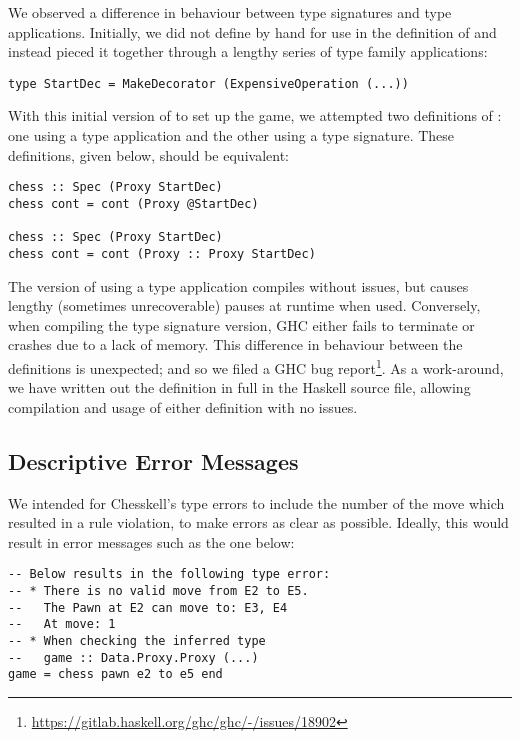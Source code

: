 We observed a difference in behaviour between type signatures and type applications. Initially, we did not define  by hand for use in the definition of  and instead pieced it together through a lengthy series of type family applications:

\begin{lstlisting}
type StartDec = MakeDecorator (ExpensiveOperation (...))
\end{lstlisting}

With this initial version of  to set up the game, we attempted two definitions of : one using a type application and the other using a type signature. These definitions, given below, should be equivalent:

\begin{lstlisting}
chess :: Spec (Proxy StartDec)
chess cont = cont (Proxy @StartDec)

chess :: Spec (Proxy StartDec)
chess cont = cont (Proxy :: Proxy StartDec)
\end{lstlisting}

The version of  using a type application compiles without issues, but causes lengthy (sometimes unrecoverable) pauses at runtime when used. Conversely, when compiling the type signature version, GHC either fails to terminate or crashes due to a lack of memory. This difference in behaviour between the definitions is unexpected; and so we filed a GHC bug report\footnote{\url{https://gitlab.haskell.org/ghc/ghc/-/issues/18902}}. As a work-around, we have written out the  definition in full in the Haskell source file, allowing compilation and usage of either definition with no issues.

\subsection{Descriptive Error Messages}

We intended for Chesskell's type errors to include the number of the move which resulted in a rule violation, to make errors as clear as possible. Ideally, this would result in error messages such as the one below:

\begin{lstlisting}
-- Below results in the following type error:
-- * There is no valid move from E2 to E5.
--   The Pawn at E2 can move to: E3, E4
--   At move: 1
-- * When checking the inferred type
--   game :: Data.Proxy.Proxy (...)
game = chess pawn e2 to e5 end
\end{lstlisting}

